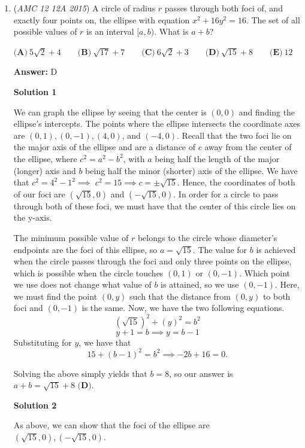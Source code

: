 \begin{enumerate}
 


	\item (\textit{AMC 12 12A 2015}) A circle of radius $r$ passes through both foci of, and exactly four points on, the ellipse with equation $x^2+16y^2=16$. The set of all possible values of $r$ is an interval $[a,b)$. What is $a+b$?


 $\textbf{(A)}\ 5\sqrt{2}+4 \qquad\textbf{(B)}\ \sqrt{17}+7 \qquad\textbf{(C)}\ 6\sqrt{2}+3 \qquad\textbf{(D)}\ \sqrt{15}+8 \qquad\textbf{(E)}\ 12$

 \textbf{Answer: }D



\textbf{Solution 1}

We can graph the ellipse by seeing that the center is $(0, 0)$ and finding the ellipse's intercepts. The points where the ellipse intersects the coordinate axes are $(0, 1), (0, -1), (4, 0)$, and $(-4, 0)$. Recall that the two foci lie on the major axis of the ellipse and are a distance of $c$ away from the center of the ellipse, where $c^2 = a^2 - b^2$, with $a$ being half the length of the major (longer) axis and $b$ being half the minor (shorter) axis of the ellipse. We have that $c^2 = 4^2 - 1^2 \implies$ $c^2 = 15 \implies c = \pm \sqrt{15}$. Hence, the coordinates of both of our foci are $(\sqrt{15}, 0)$ and $(-\sqrt{15}, 0)$. In order for a circle to pass through both of these foci, we must have that the center of this circle lies on the y-axis.

 The minimum possible value of $r$ belongs to the circle whose diameter's endpoints are the foci of this ellipse, so $a = \sqrt{15}$. The value for $b$ is achieved when the circle passes through the foci and only three points on the ellipse, which is possible when the circle touches $(0, 1)$ or $(0, -1)$. Which point we use does not change what value of $b$ is attained, so we use $(0, -1)$. Here, we must find the point $(0, y)$ such that the distance from $(0, y)$ to both foci and $(0, -1)$ is the same. Now, we have the two following equations. 
 \[(\sqrt{15})^2 + (y)^2 = b^2\] 
 \[y + 1 = b \implies y = b - 1\] Substituting for $y$, we have that 
 \[15 + (b - 1)^2 = b^2 \implies -2b + 16 = 0.\]

 Solving the above simply yields that $b = 8$, so our answer is $a + b = \sqrt{15} + 8 \textbf{ (D)}$.

 



\textbf{Solution 2}

As above, we can show that the foci of the ellipse are $(\sqrt{15},0), (-\sqrt{15},0).$


\end{enumerate}
